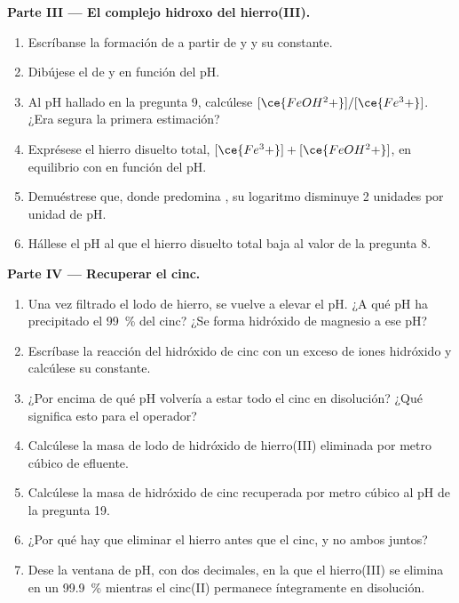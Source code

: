 \begin{problem}
\medskip
\noindent\textbf{Parte III --- El complejo hidroxo del hierro(III).}
\begin{enumerate}[resume]
  \item Escríbanse la formación de  a partir de  y
         y su constante.
  \item Dibújese el  de  y  en
        función del pH.
  \item Al pH hallado en la pregunta 9, calcúlese
        $[\ce{FeOH^2+}]/[\ce{Fe^3+}]$. ¿Era segura la primera estimación?
  \item Exprésese el hierro disuelto total, $[\ce{Fe^3+}] + [\ce{FeOH^2+}]$,
        en equilibrio con  en función del pH.
  \item Demuéstrese que, donde predomina , su logaritmo
        disminuye 2 unidades por unidad de pH.
  \item Hállese el pH al que el hierro disuelto total baja al valor de la
        pregunta 8.
\end{enumerate}

\medskip
\noindent\textbf{Parte IV --- Recuperar el cinc.}
\begin{enumerate}[resume]
  \item Una vez filtrado el lodo de hierro, se vuelve a elevar el pH. ¿A
        qué pH ha precipitado el \qty{99}{\percent} del cinc? ¿Se forma
        hidróxido de magnesio a ese pH?
  \item Escríbase la reacción del hidróxido de cinc con un exceso de iones
        hidróxido y calcúlese su constante.
  \item ¿Por encima de qué pH volvería a estar todo el cinc en disolución?
        ¿Qué significa esto para el operador?
  \item Calcúlese la masa de lodo de hidróxido de hierro(III) eliminada
        por metro cúbico de efluente.
  \item Calcúlese la masa de hidróxido de cinc recuperada por metro cúbico
        al pH de la pregunta 19.
  \item ¿Por qué hay que eliminar el hierro antes que el cinc, y no ambos
        juntos?
  \item Dese la ventana de pH, con dos decimales, en la que el hierro(III)
        se elimina en un \qty{99.9}{\percent} mientras el cinc(II)
        permanece íntegramente en disolución.
\end{enumerate}
\end{problem}
